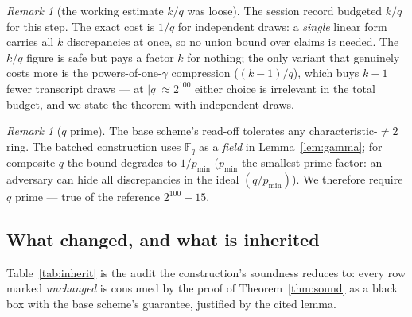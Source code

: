 \documentclass[11pt]{article}
\newcommand{\F}{\mathbb{F}}
\newcommand{\Fq}{\F_q}                 %
\theoremstyle{plain}
\theoremstyle{definition}
\theoremstyle{remark}
\newtheorem{remark}[theorem]{Remark}
\begin{document}
\begin{remark}[the working estimate $k/q$ was loose]\label{rem:kq}
The session record budgeted $k/q$ for this step. The exact cost is $1/q$ for
independent draws: a \emph{single} linear form carries all $k$ discrepancies
at once, so no union bound over claims is needed. The $k/q$ figure is safe but
pays a factor $k$ for nothing; the only variant that genuinely costs more is
the powers-of-one-$\gamma$ compression ($(k-1)/q$), which buys $k-1$ fewer
transcript draws --- at $\lvert q\rvert\approx2^{100}$ either choice is
irrelevant in the total budget, and we state the theorem with independent
draws.
\end{remark}

\begin{remark}[$q$ prime]\label{rem:qprime}
The base scheme's read-off tolerates any characteristic-$\ne2$ ring. The
batched construction uses $\Fq$ as a \emph{field} in Lemma~\ref{lem:gamma};
for composite $q$ the bound degrades to $1/p_{\min}$ ($p_{\min}$ the smallest
prime factor: an adversary can hide all discrepancies in the ideal
$(q/p_{\min})$). We therefore require $q$ prime --- true of the reference
$2^{100}-15$.
\end{remark}

\subsection{What changed, and what is inherited}

Table~\ref{tab:inherit} is the audit the construction's soundness reduces to:
every row marked \emph{unchanged} is consumed by the proof of
Theorem~\ref{thm:sound} as a black box with the base scheme's guarantee,
justified by the cited lemma.
\end{document}
